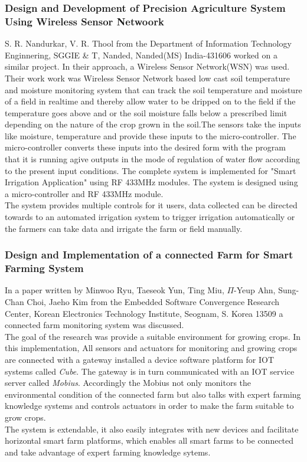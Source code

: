 \documentclass[12pt, a4paper]{article}
\begin{document}
\subsubsection{Design and Development of Precision Agriculture System Using Wireless Sensor Netwoork}
S. R. Nandurkar, V. R. Thool from the Department of Information Technology Enginnering, SGGIE \& T, Nanded, Nanded(MS) India-431606 worked on a similar project. In their approach, a Wireless Sensor Network(WSN) was used.\\
Their work work was Wireless Sensor Network based low cast soil temperature and moisture monitoring system that can track the soil temperature and moisture of a field in realtime and thereby allow water to be dripped on to the field if the temperature goes above and or the soil moisture falls below a prescribed limit depending on the nature of the crop grown in the soil.The sensors take the inputs like moisture, temperature and provide these inputs to the micro-controller. The micro-controller converts these inputs into the desired form with the program that it is running agive outputs in the mode of regulation of water flow according to the present input conditions. The complete system is implemented for "Smart Irrigation Application" using RF 433MHz modules. The system is designed using a micro-controller and RF 433MHz module.\\ The system provides multiple controls for it users, data collected can be directed towards to an automated irrigation system to trigger irrigation automatically or the farmers can take data and irrigate the farm or field manually.  
\subsubsection{Design and Implementation of a connected Farm for Smart Farming System}
In a paper written by Minwoo Ryu, Taeseok Yun, Ting Miu, $\Pi$-Yeup Ahn, Sung-Chan Choi, Jaeho Kim from the Embedded Software Convergence Research Center, Korean Electronics Technology Institute, Seognam, S. Korea 13509 a connected farm monitoring system was discussed.\\
The goal of the research was provide a suitable environment for growing crops. In this implementation, All sensors and actuators for monitoring and growing crops are connected with a gateway installed a device software platform for IOT systems called \emph{Cube}. The gateway is in turn communicated with an IOT service server called \emph{Mobius}. Accordingly the Mobius not only monitors the environmental condition of the connected farm but also talks with expert farming knowledge systems and controls actuators in order to make the farm suitable to grow crops.\\
The system is extendable, it also easily integrates with new devices and facilitate horizontal smart farm platforms, which enables all smart farms to be connected and take advantage of expert farming knowledge sytems.      
\end{document}
